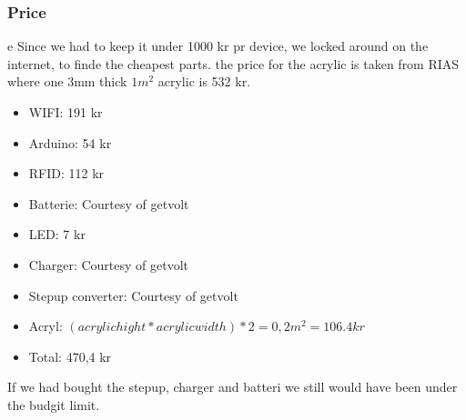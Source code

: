 \subsubsection{Price}e
Since we had to keep it under 1000 kr pr device, we locked around on the internet, to finde the cheapest parts.
the price for the acrylic is taken from RIAS \cite{RIAS} where one 3mm thick $1 m^2$ acrylic is 532 kr.
\begin{itemize} \itemsep0em
	 \item WIFI: 191 kr \cite{Adafruit}
	 \item Arduino: 54 kr \cite{Sparkfun}
	 \item RFID: 112 kr \cite{Let-Eletronik}
	 \item Batterie: Courtesy of getvolt  \cite{Getvolt}
	 \item LED: 7 kr \cite{Adafruit}
	 \item Charger: Courtesy of getvolt \cite{Getvolt}
	 \item Stepup converter: Courtesy of getvolt  \cite{Getvolt}
	  \item Acryl: $(acrylic hight * acrylic width)*2 = 0,2 m^2 = 106.4 kr $ \cite{RIAS}
	 \item Total: 470,4 kr
\end{itemize}
If we had bought the stepup, charger and batteri we still would have been under the budgit limit.
